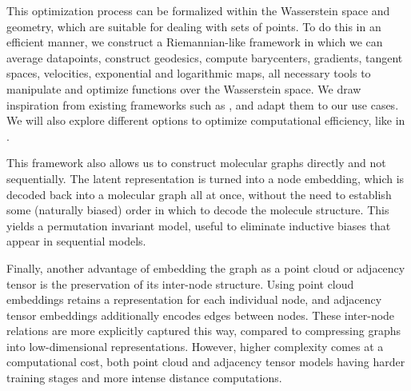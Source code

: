 \documentclass[11pt]{article}
\begin{document}
This optimization process can be formalized within the Wasserstein space and geometry, which are suitable for dealing with sets of points. To do this in an efficient manner, we construct a Riemannian-like framework in which we can average datapoints, construct geodesics, compute barycenters, gradients, tangent spaces, velocities, exponential and logarithmic maps, all necessary tools to manipulate and optimize functions over the Wasserstein space. We draw inspiration from existing frameworks such as \cite{chowdhury2019gromovwasserstein}, and adapt them to our use cases. We will also explore different options to optimize computational efficiency, like in \cite{seguy2015principal, heeren2018principal}.

This framework also allows us to construct molecular graphs directly and not sequentially. The latent representation is turned into a node embedding, which is decoded back into a molecular graph all at once, without the need to establish some (naturally biased) order in which to decode the molecule structure. This yields a permutation invariant model, useful to eliminate inductive biases that appear in sequential models.

Finally, another advantage of embedding the graph as a point cloud or adjacency tensor is the preservation of its inter-node structure. Using point cloud embeddings retains a representation for each individual node, and adjacency tensor embeddings additionally encodes edges between nodes. These inter-node relations are more explicitly captured this way, compared to compressing graphs into low-dimensional representations. However, higher complexity comes at a computational cost, both point cloud and adjacency tensor models having harder training stages and more intense distance computations.

\medskip


\end{document}
